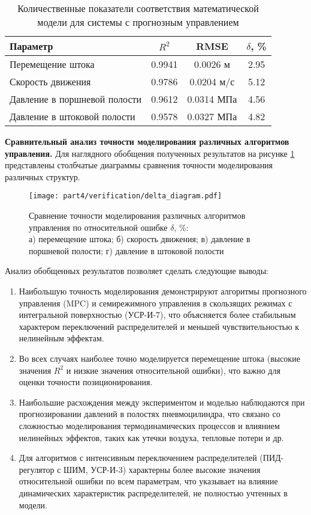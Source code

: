 \begin{table}[ht]
	\centering
	\caption{Количественные показатели соответствия математической модели для системы с прогнозным управлением}
	\small
	\label{tab:mpc_validation}
	\begin{tabular}{lccc}
		\hline
		\textbf{Параметр}            & $R^2$        & RMSE             & $\delta$, \% \\
		\hline
		Перемещение штока            & \num{0.9941} & \num{0.0026} м   & \num{2.95}   \\
		Скорость движения            & \num{0.9786} & \num{0.0204} м/с & \num{5.12}   \\
		Давление в поршневой полости & \num{0.9612} & \num{0.0314} МПа & \num{4.56}   \\
		Давление в штоковой полости  & \num{0.9578} & \num{0.0327} МПа & \num{4.82}   \\
		\hline
	\end{tabular}
\end{table}

\textbf{Сравнительный анализ точности моделирования различных алгоритмов управления.}
Для наглядного обобщения полученных результатов на рисунке \ref{fig:validation_comparison} представлены столбчатые диаграммы
сравнения точности моделирования различных структур.
\begin{figure}[ht]
	\centering
	\texttt{[image: part4/verification/delta\_diagram.pdf]}
	\caption{Сравнение точности моделирования различных алгоритмов управления по относительной ошибке $\delta$, \%:\\
		а) перемещение штока; б) скорость движения; в) давление в поршневой полости; г) давление в штоковой полости}
	\label{fig:validation_comparison}
\end{figure}

Анализ обобщенных результатов позволяет сделать следующие выводы:

\begin{enumerate}
	\item Наибольшую точность моделирования демонстрируют алгоритмы прогнозного управления (MPC) и семирежимного
	      управления в скользящих режимах с интегральной поверхностью (УСР-И-7),
	      что объясняется более стабильным характером переключений распределителей
	      и меньшей чувствительностью к нелинейным эффектам.
	\item Во всех случаях наиболее точно моделируется перемещение штока (высокие значения $R^2$ и низкие значения относительной ошибки),
	      что важно для оценки точности позиционирования.
	\item Наибольшие расхождения между экспериментом и моделью наблюдаются при прогнозировании давлений в полостях пневмоцилиндра,
	      что связано со сложностью моделирования термодинамических процессов и
	      влиянием нелинейных эффектов, таких как утечки воздуха, тепловые потери и др.
	\item Для алгоритмов с интенсивным переключением распределителей (ПИД-регулятор с ШИМ, УСР-И-3)
	      характерны более высокие значения
	      относительной ошибки по всем параметрам, что указывает на влияние динамических
	      характеристик распределителей, не полностью учтенных в модели.
\end{enumerate}

